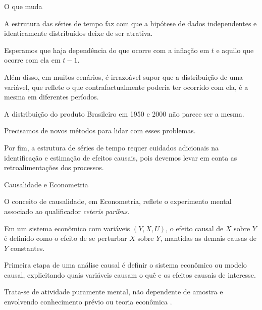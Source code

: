 \documentclass[11pt]{beamer}
\newenvironment{halfwideitemize}{\itemize\addtolength{\itemsep}{0.5em}}{\enditemize}
\begin{document}
	\begin{frame}{O que muda}
				\begin{halfwideitemize}
					\item A estrutura das séries de tempo faz com que a hipótese de dados independentes e identicamente distribuídos deixe de ser atrativa.
		\begin{halfwideitemize}
			\item Esperamos que haja dependência do que ocorre com a inflação em $t$ e aquilo que ocorre com ela em $t-1$.
			\item Além disso, em muitos cenários, é irrazoável supor que a distribuição de uma variável, que reflete o que contrafactualmente poderia ter ocorrido com ela, é a mesma em diferentes períodos.
			\begin{halfwideitemize}
				\item A distribuição do produto Brasileiro em 1950 e 2000 não parece ser a mesma.
			\end{halfwideitemize} 
			\item Precisamos de novos métodos para lidar com esses problemas.
			
		\end{halfwideitemize}
							\item Por fim, a estrutura de séries de tempo requer cuidados adicionais na identificação e estimação de {\color{blue}efeitos causais}, pois devemos levar em conta as retroalimentações dos processos.
			\end{halfwideitemize}
	\end{frame}
	
	\begin{frame}{Causalidade e Econometria}
		\begin{halfwideitemize}
			\item O conceito de causalidade, em Econometria, reflete o experimento mental associado ao qualificador \textit{ceteris paribus}.
			\item Em um sistema econômico com variáveis $(Y,X,U)$, o efeito causal de $X$ sobre $Y$ é {\color{blue}definido} como o efeito de se perturbar $X$ sobre $Y$, {\color{red}mantidas as demais causas de $Y$ constantes.}
			\item Primeira etapa de uma análise causal é definir o sistema econômico ou modelo causal, explicitando quais variáveis causam o quê e os efeitos causais de interesse.
			\begin{halfwideitemize}
				\item Trata-se de {\color{blue}atividade puramente mental}, não dependente de amostra e envolvendo conhecimento prévio ou teoria econômica \citep{Heckman2022}.
			\end{halfwideitemize}
		\end{halfwideitemize}
	\end{frame}
	
\end{document}
